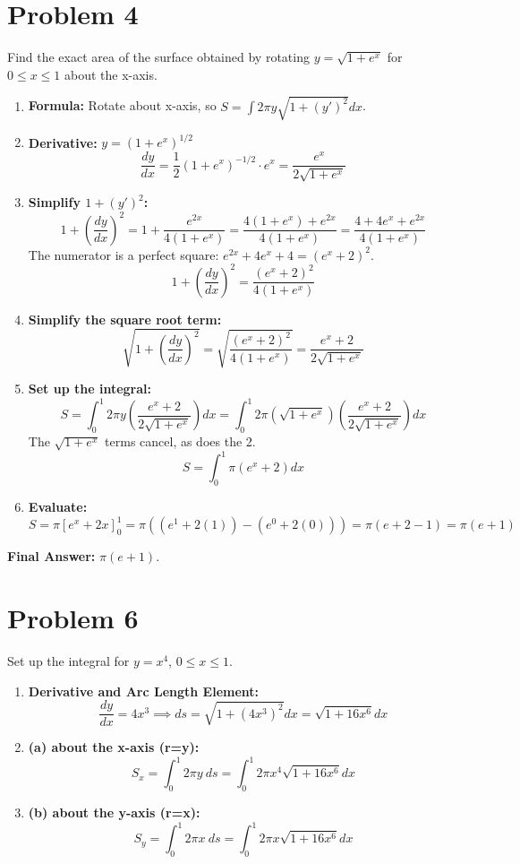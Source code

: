 \documentclass{article}
\begin{document}
\section{Problem 4}
Find the exact area of the surface obtained by rotating \(y = \sqrt{1+e^x}\) for \(0 \le x \le 1\) about the x-axis.
\begin{enumerate}
    \item \textbf{Formula:} Rotate about x-axis, so \(S = \int 2\pi y \sqrt{1+(y')^2} dx\).
    \item \textbf{Derivative:} \(y = (1+e^x)^{1/2}\)
    \[ \frac{dy}{dx} = \frac{1}{2}(1+e^x)^{-1/2} \cdot e^x = \frac{e^x}{2\sqrt{1+e^x}} \]
    \item \textbf{Simplify \(1+(y')^2\):}
    \[ 1 + \left(\frac{dy}{dx}\right)^2 = 1 + \frac{e^{2x}}{4(1+e^x)} = \frac{4(1+e^x) + e^{2x}}{4(1+e^x)} = \frac{4+4e^x+e^{2x}}{4(1+e^x)} \]
    The numerator is a perfect square: \(e^{2x} + 4e^x + 4 = (e^x+2)^2\).
    \[ 1 + \left(\frac{dy}{dx}\right)^2 = \frac{(e^x+2)^2}{4(1+e^x)} \]
    \item \textbf{Simplify the square root term:}
    \[ \sqrt{1 + \left(\frac{dy}{dx}\right)^2} = \sqrt{\frac{(e^x+2)^2}{4(1+e^x)}} = \frac{e^x+2}{2\sqrt{1+e^x}} \]
    \item \textbf{Set up the integral:}
    \[ S = \int_{0}^{1} 2\pi y \left(\frac{e^x+2}{2\sqrt{1+e^x}}\right) dx = \int_{0}^{1} 2\pi (\sqrt{1+e^x}) \left(\frac{e^x+2}{2\sqrt{1+e^x}}\right) dx \]
    The \(\sqrt{1+e^x}\) terms cancel, as does the 2.
    \[ S = \int_{0}^{1} \pi (e^x+2) dx \]
    \item \textbf{Evaluate:}
    \[ S = \pi \left[ e^x + 2x \right]_{0}^{1} = \pi \left( (e^1 + 2(1)) - (e^0 + 2(0)) \right) = \pi(e+2-1) = \pi(e+1) \]
\end{enumerate}
\textbf{Final Answer:} \(\pi(e+1)\).

\section{Problem 6}
Set up the integral for \(y=x^4\), \(0 \le x \le 1\).
\begin{enumerate}
    \item \textbf{Derivative and Arc Length Element:}
    \[ \frac{dy}{dx} = 4x^3 \implies ds = \sqrt{1+(4x^3)^2}dx = \sqrt{1+16x^6}dx \]
    \item \textbf{(a) about the x-axis (r=y):}
    \[ S_x = \int_{0}^{1} 2\pi y \ ds = \int_{0}^{1} 2\pi x^4 \sqrt{1+16x^6} dx \]
    \item \textbf{(b) about the y-axis (r=x):}
    \[ S_y = \int_{0}^{1} 2\pi x \ ds = \int_{0}^{1} 2\pi x \sqrt{1+16x^6} dx \]
\end{enumerate}
\end{document}
